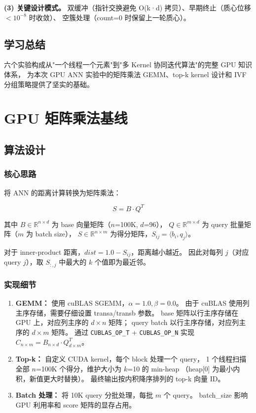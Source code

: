 \documentclass[UTF8,a4paper,10pt]{ctexart}
\begin{document}
\textbf{(3) 关键设计模式。}
双缓冲（指针交换避免 O(k·d) 拷贝）、早期终止（质心位移 $< 10^{-8}$ 时收敛）、
空簇处理（count=0 时保留上一轮质心）。

\subsection{学习总结}

六个实验构成从"一个线程一个元素"到"多 Kernel 协同迭代算法"的完整 GPU 知识体系，
为本次 GPU ANN 实验中的矩阵乘法 GEMM、top-k kernel 设计和 IVF 分组策略提供了坚实的基础。

\section{GPU 矩阵乘法基线}
\label{sec:matmul}

\subsection{算法设计}

\subsubsection{核心思路}

将 ANN 的距离计算转换为矩阵乘法：

\begin{equation}
S = B \cdot Q^T
\end{equation}

其中 $B \in \mathbb{R}^{n \times d}$ 为 base 向量矩阵（$n$=100K, $d$=96），
$Q \in \mathbb{R}^{m \times d}$ 为 query 批量矩阵（$m$ 为 batch size），
$S \in \mathbb{R}^{n \times m}$ 为得分矩阵，$S_{ij} = \langle b_i, q_j \rangle$。

对于 inner-product 距离，$dist = 1.0 - S_{ij}$，距离越小越近。
因此对每列 $j$（对应 query $j$），取 $S_{:,j}$ 中最大的 $k$ 个值即为最近邻。

\subsubsection{实现细节}

\begin{enumerate}[itemsep=0pt]
\item \textbf{GEMM：} 使用 cuBLAS SGEMM，$\alpha=1.0, \beta=0.0$。
由于 cuBLAS 使用列主序存储，需要仔细设置 transa/transb 参数。
base 矩阵以行主序存储在 GPU 上，对应列主序的 $d \times n$ 矩阵；
query batch 以行主序存储，对应列主序的 $d \times m$ 矩阵。
通过 \texttt{CUBLAS\_OP\_T} + \texttt{CUBLAS\_OP\_N} 实现
$C_{n \times m} = B_{n \times d} \cdot Q^T_{d \times m}$。
\item \textbf{Top-k：} 自定义 CUDA kernel，每个 block 处理一个 query，
1 个线程扫描全部 $n$=100K 个得分，维护大小为 $k$=10 的 min-heap
（heap[0] 为最小内积，新值更大时替换）。
最终输出按内积降序排列的 top-k 向量 ID。
\item \textbf{Batch 处理：} 将 10K query 分批处理，每批 $m$ 个 query。
batch\_size 影响 GPU 利用率和 score 矩阵的显存占用。
\end{enumerate}
\end{document}
